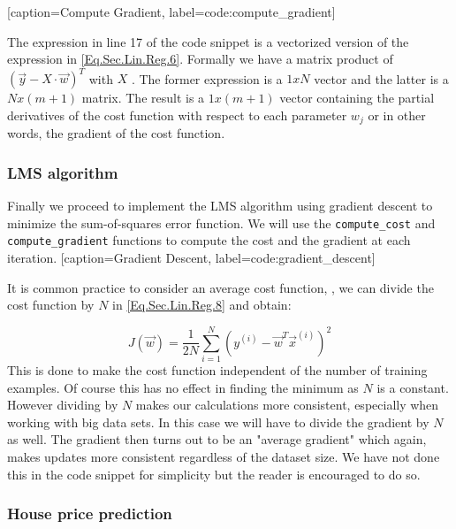 [caption={Compute Gradient}, label={code:compute_gradient}]

\begin{remark}
	The expression in line 17 of the code snippet is a vectorized version of the expression in \cref{Eq.Sec.Lin.Reg.6}. Formally we have a matrix product of $(\vec{y}- X\cdot \vec{w})^T$ with $X$ . The former expression is a $1xN$ vector and the latter is a $Nx(m+1)$ matrix.  The result is a $1x(m+1)$ vector containing the partial derivatives of the cost function with respect to each parameter $w_j$ or in other words, the gradient of the cost function.
\end{remark}

\subsubsection*{LMS algorithm} 
Finally we proceed to implement the LMS algorithm using gradient descent to minimize the sum-of-squares error function. We will use the \texttt{compute\_cost} and \texttt{compute\_gradient} functions to compute the cost and the gradient at each iteration. 
[caption={Gradient Descent}, label={code:gradient_descent}]

\begin{observation}
It is common practice to consider an average cost function, \ie, we can divide the cost function by $N$ in \cref{Eq.Sec.Lin.Reg.8} and obtain:  

\begin{equation}\label{Eq.Sec.Lin.Reg.10}
	J(\vec{w}) = \frac{1}{2N}\sum_{i=1}^{N} (y^{(i)} - \vec{w}^T \vec{x}^{(i)})^2
\end{equation}
This is done to make the cost function independent of the number of training examples. Of course this has no effect in finding the minimum as $N$ is a constant. However dividing by $N$ makes our calculations more consistent, especially when working with big data sets.  In this case we will have to divide the gradient by $N$ as well. The gradient then turns out to be an "average gradient" which again, makes updates more consistent regardless of the dataset size. We have not done this in the code snippet for simplicity but the reader is encouraged to do so. 
\end{observation}

\subsubsection{House price prediction}

